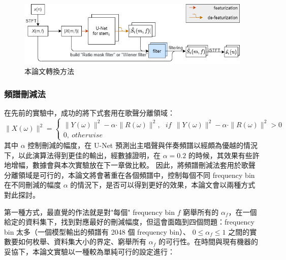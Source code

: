 \begin{figure}[htbp]
    \hfil
    \begin{minipage}[t]{0.8\textwidth}
        \includegraphics[width=\textwidth]{./figures/chapter04_experiment/Filter2.png}
        \caption {本論文轉換方法}
        \label{Filter2}
    \end{minipage}
    \hfil
\end{figure}

\subsubsection{頻譜刪減法}
在先前的實驗中，成功的將下式套用在歌聲分離領域：
\begin{equation}
	\|X(\omega)\|^2=\left\{\begin{matrix}\|Y(\omega)\|^2-\alpha\cdot\|R(\omega)\|^2,\ \ \ if\ \ \|Y(\omega)\|^2-\alpha\cdot\|R(\omega)\|^2 > 0
\\ 
0,\ otherwise
\end{matrix}\right.
\end{equation}
其中 $\alpha$ 控制刪減的幅度，在 U-Net 預測出主唱聲與伴奏頻譜以經頗為優越的情況下，以此演算法得到更佳的輸出，經數據證明，在 $\alpha=0.2$ 的時候，其效果有些許地增幅，數據會與本次實驗放在下一章做比較。
因此，將頻譜刪減法套用於歌聲分離領域是可行的，本論文將會著重在各個頻譜中，控制每個不同 frequency bin 在不同刪減的幅度 $\alpha$ 的情況下，是否可以得到更好的效果，本論文會以兩種方式對此探討。

第一種方式，最直覺的作法就是對"每個" frequency bin $f$ 窮舉所有的 $\alpha_f$，在一個給定的資料集下，找到對應最好的刪減幅度，但這會面臨到四個問題：frequency bin 太多（一個模型輸出的頻譜有 2048 個 frequency bin）、 $0\leq\alpha_f\leq1$ 之間的實數要如何枚舉、資料集大小的界定、窮舉所有 $\alpha_f$ 的可行性。在時間與現有機器的妥協下，本論文實驗以一種較為單純可行的設定進行：

